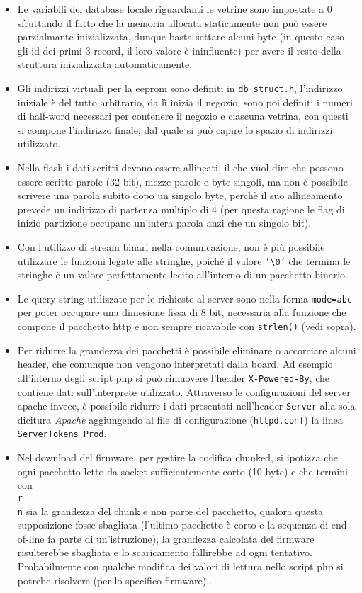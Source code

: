 \begin{itemize}
\item Le variabili del database locale riguardanti le vetrine sono impostate a 0 sfruttando il fatto che la memoria allocata staticamente non pu\`o essere parzialmante inizializzata, dunque basta settare alcuni byte (in questo caso gli id dei primi 3 record, il loro valore \`e ininfluente) per avere il resto della struttura inizializzata automaticamente.
\item Gli indirizzi virtuali per la eeprom sono definiti in \texttt{db\_struct.h}, l'indirizzo iniziale \`e del tutto arbitrario, da lì inizia il negozio, sono poi definiti i numeri di half-word necessari per contenere il negozio e ciascuna vetrina, con questi si compone l'indirizzo finale, dal quale si pu\`o capire lo spazio di indirizzi utilizzato.
\item Nella flash i dati scritti devono essere allineati, il che vuol dire che possono essere scritte parole (32 bit), mezze parole e byte singoli, ma non è possibile scrivere una parola subito dopo un singolo byte, perch\`e il suo allineamento prevede un indirizzo di partenza multiplo di 4 (per questa ragione le flag di inizio partizione occupano un'intera parola anzi che un singolo bit).
\item Con l'utilizzo di stream binari nella comunicazione, non \`e pi\`u possibile utilizzare le funzioni legate alle stringhe, poich\'e il valore \texttt{'\textbackslash 0'} che termina le stringhe \`e un valore perfettamente lecito all'interno di un pacchetto binario.
\item Le query string utilizzate per le richieste al server sono nella forma \texttt{mode=abc} per poter occupare una dimesione fissa di 8 bit, necessaria alla funzione che compone il pacchetto http e non sempre ricavabile con \texttt{strlen()} (vedi sopra).
\item Per ridurre la grandezza dei pacchetti \`e possibile eliminare o accorciare alcuni header, che comunque non vengono interpretati dalla board. Ad esempio all'interno degli script php si pu\`o rimuovere l'header \texttt{X-Powered-By}, che contiene dati sull'interprete utilizzato. Attraverso le configurazioni del server apache invece, \`e possibile ridurre i dati presentati nell'header \texttt{Server} alla sola dicitura \textit{Apache} aggiungendo al file di configurazione (\texttt{httpd.conf}) la linea \texttt{ServerTokens Prod}.
\item Nel download del firmware, per gestire la codifica chunked, si ipotizza che ogni pacchetto letto da socket sufficientemente corto (10 byte) e che termini con \texttt{\\r\\n} sia la grandezza del chunk e non parte del pacchetto, qualora questa supposizione fosse sbagliata (l'ultimo pacchetto \`e corto e la sequenza di end-of-line fa parte di un'istruzione), la grandezza calcolata del firmware risulterebbe sbagliata e lo scaricamento fallirebbe ad ogni tentativo. Probabilmente con qualche modifica dei valori di lettura nello script php si potrebe risolvere (per lo specifico firmware)..

\end{itemize}
